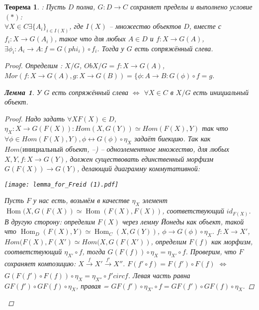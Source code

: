 \documentclass[a4paper]{article}
\theoremstyle{indented}
\newtheorem{theorem}{Теорема}
\newtheorem{lemma}{Лемма}
\theoremstyle{definition}
\theoremstyle{remark}
\DeclareMathOperator{\Hom}{Hom}
\begin{document}
\begin{theorem} : Пусть $D$ полна, $G: D \longrightarrow C$ сохраняет пределы и выполнено условие $(*)$:
\\ $\forall X \in C \exists \lbrace A_i \rbrace_{i \in I(X)}$, где $I(X)$ -- множество объектов $D$, вместе с $f_i : X \longrightarrow G(A_i)$, такое что для любых $A \in D$ и $f: X \longrightarrow G(A)$, $\exists \phi_i : A_i \longrightarrow A: f = G(phi_i) \circ f_i$. Тогда у $G$ есть сопряжённый слева. 
\begin{proof}
Определим : $X/G$, $ObX/G = f: X \rightarrow G(A)$, $Mor(f: X \rightarrow G(A), g: X \rightarrow G(B)) = \lbrace \phi: A \rightarrow B: G(\phi) \circ f = g$.
\begin{lemma} У $G$ есть сопряжённый слева $\Leftrightarrow$ $\forall X \in C$ в $X/G$ есть инициальный объект.
\begin{proof} Надо задать $\forall X F(X) \in D$, $\eta_X: X \rightarrow G(F(X)): Hom(X, G(Y)) \simeq Hom(F(X), Y)$ так что $\forall \phi \in Hom(F(X), Y), \phi \longleftrightarrow G(\phi)\circ \eta_X$ задаёт биекцию. Так как $Hom(инициальный$ объект, --) -- одноэлементное множество, для любых $X, Y, f: X \rightarrow G(Y)$, должен существовать единственный морфизм $G(F(X)) \rightarrow G(Y)$, делающий диаграмму коммутативной: 
\begin{center}
    \texttt{[image: lemma\_for\_Freid (1).pdf]}
\end{center} 
Пусть $F$ у нас есть, возьмём в качестве $\eta_X$ элемент $\Hom(X, G(F(X)) \simeq \Hom(F(X), F(X))$, соответствующий $id_{F(X)}$. \\

В другую сторону: определим $F(X)$ через лемму Йонеды как объект, такой что $\Hom_D(F(X), Y) \simeq \Hom_C(X, G(Y))$, $\phi \rightarrow G(\phi) \circ \eta_X$. $f: X \rightarrow X'$, $Hom(F(X), F(X') \simeq Hom(X, G(F(X'))$, определим $F(f)$ как морфизм, соответствующий $\eta_{X'} \circ f$, тогда $G(F(f)) \circ \eta_X = \eta_{X'} \circ f$. Проверим, что $F$ сохраняет композицию:  $X \xrightarrow[]{f} X' \xrightarrow[]{f'} X''$. $F(f' \circ f) = F(f') \circ F(f)$ $\Leftrightarrow$ $G(F(f') \circ F(f)) \circ \eta_X = \eta_{X''} \circ f' circ f$. Левая часть равна $GF(f') \circ GF(f) \circ \eta_X$, правая = $GF(f') \circ \eta_{X'} \circ f = GF(f') \circ GF(f) \circ \eta_X$.
\end{proof}
\end{lemma}
\end{proof}
\end{theorem}
\end{document}
